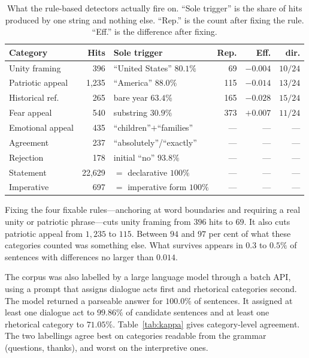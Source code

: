 \documentclass[pdflatex,sn-mathphys-num]{sn-jnl}%
\begin{document}
\begin{appendices}
\begin{table}[h]
\caption{What the rule-based detectors actually fire on. ``Sole trigger'' is
the share of hits produced by one string and nothing else. ``Rep.'' is the
count after fixing the rule. ``Eff.'' is the difference after fixing.}
\label{tab:regex}
\centering
\footnotesize
\setlength{\tabcolsep}{2pt}
\begin{tabular}{lrlrrr}
\toprule
Category & Hits & Sole trigger & Rep. & Eff. & dir. \\
\midrule
Unity framing     & 396   & ``United States'' $80.1\%$ & 69  & $-0.004$ & $10/24$ \\
Patriotic appeal  & 1{,}235 & ``America'' $88.0\%$     & 115 & $-0.014$ & $13/24$ \\
Historical ref.   & 265   & bare year $63.4\%$         & 165 & $-0.028$ & $15/24$ \\
Fear appeal       & 540   & substring $30.9\%$         & 373 & $+0.007$ & $11/24$ \\
Emotional appeal  & 435   & ``children''$+$``families'' & --- & --- & --- \\
Agreement         & 237   & ``absolutely''/``exactly'' & --- & --- & --- \\
Rejection         & 178   & initial ``no'' $93.8\%$    & --- & --- & --- \\
Statement         & 22{,}629 & $=$ declarative $100\%$ & --- & --- & --- \\
Imperative        & 697 & $=$ imperative form $100\%$  & --- & --- & --- \\
\bottomrule
\end{tabular}
\end{table}

Fixing the four fixable rules---anchoring at word boundaries and requiring a
real unity or patriotic phrase---cuts unity framing from $396$ hits to $69$.
It also cuts patriotic appeal from $1{,}235$ to $115$. Between $94$ and $97$
per cent
of what these categories counted was something else. What survives appears
in $0.3$ to $0.5\%$ of sentences with differences no larger than $0.014$.

The corpus was also labelled by a large language model through a batch API,
using a prompt that assigns dialogue acts first and rhetorical categories
second. The model returned a parseable answer for $100.0\%$ of sentences. It
assigned at least one dialogue act to $99.86\%$ of candidate sentences and
at least one rhetorical category to $71.05\%$. Table~\ref{tab:kappa} gives
category-level agreement. The two labellings agree best on categories
readable from the grammar (questions, thanks), and worst on the
interpretive ones.


\end{appendices}
\end{document}
